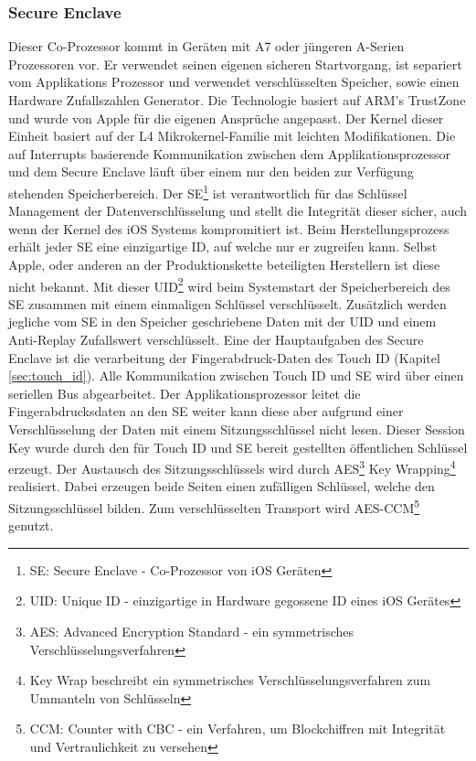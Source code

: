 	\subsubsection{Secure Enclave}\label{sec:secure_enclave}
		Dieser Co-Prozessor kommt in Geräten mit A7 oder jüngeren A-Serien Prozessoren
		vor. Er verwendet seinen eigenen sicheren Startvorgang, ist separiert vom
		Applikations Prozessor und verwendet verschlüsselten Speicher, sowie einen
		Hardware Zufallszahlen Generator. Die Technologie basiert auf ARM's
		TrustZone\cite{TrustZone2015}
		und wurde von Apple für die eigenen Ansprüche angepasst. Der Kernel dieser
		Einheit basiert auf der L4
		Mikrokernel-Familie\cite{L4MicroKernel2015} mit leichten
		Modifikationen. Die auf Interrupts basierende Kommunikation zwischen dem
		Applikationsprozessor und dem Secure Enclave läuft über einem nur den beiden zur Verfügung stehenden Speicherbereich.
		Der SE\footnote{SE: Secure Enclave - Co-Prozessor von iOS Geräten} ist
		verantwortlich für das Schlüssel Management der Datenverschlüsselung und stellt die Integrität dieser sicher, auch wenn der
		Kernel des iOS Systems kompromitiert ist. Beim Herstellungsprozess erhält
		jeder SE eine einzigartige ID, auf welche nur er zugreifen kann. Selbst Apple,
		oder anderen an der Produktionskette beteiligten Herstellern ist diese nicht bekannt.
		Mit dieser UID\footnote{UID: Unique ID - einzigartige in Hardware gegossene ID
		eines iOS Gerätes} wird beim Systemstart der Speicherbereich des SE zusammen mit einem
		einmaligen Schlüssel verschlüsselt.
		Zusätzlich werden jegliche vom SE in den Speicher geschriebene Daten mit der
		UID und einem Anti-Replay Zufallswert verschlüsselt. Eine der Hauptaufgaben
		des Secure Enclave ist die verarbeitung der Fingerabdruck-Daten des Touch ID
		(Kapitel \ref{sec:touch_id}).
		Alle Kommunikation zwischen Touch ID und SE wird über einen seriellen Bus
		abgearbeitet. Der Applikationsprozessor leitet die Fingerabdrucksdaten an den
		SE weiter kann diese aber aufgrund einer Verschlüsselung der Daten mit einem
		Sitzungsschlüssel nicht lesen. Dieser Session Key wurde durch den für Touch
		ID und SE bereit gestellten öffentlichen Schlüssel erzeugt. Der Austausch des
		Sitzungsschlüssels wird durch AES\footnote{AES: Advanced Encryption Standard
		- ein symmetrisches Verschlüsselungsverfahren} Key
		Wrapping\footnote{Key Wrap beschreibt ein symmetrisches
		Verschlüsselungsverfahren zum Ummanteln von Schlüsseln} realisiert.
		Dabei erzeugen beide Seiten einen zufälligen Schlüssel, welche den Sitzungsschlüssel bilden.
		Zum verschlüsselten Transport wird AES-CCM\footnote{CCM: Counter with CBC -
		ein Verfahren, um Blockchiffren mit Integrität und Vertraulichkeit zu
		versehen} genutzt.
